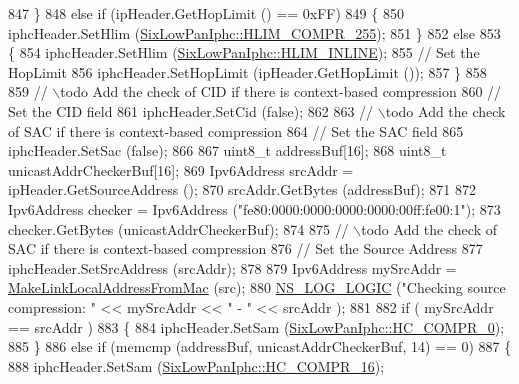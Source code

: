 \begin{DoxyCode}
847         \}
848       \textcolor{keywordflow}{else} \textcolor{keywordflow}{if} (ipHeader.GetHopLimit () == 0xFF)
849         \{
850           iphcHeader.SetHlim (\hyperlink{classns3_1_1SixLowPanIphc_a1fa5a18c5d53fd3583960b4ba01f093da7bc2759c764e52c397400f895fd6cb76}{SixLowPanIphc::HLIM\_COMPR\_255});
851         \}
852       \textcolor{keywordflow}{else}
853         \{
854           iphcHeader.SetHlim (\hyperlink{classns3_1_1SixLowPanIphc_a1fa5a18c5d53fd3583960b4ba01f093da5ac066771c5c58f74fbff81925000bd1}{SixLowPanIphc::HLIM\_INLINE});
855           \textcolor{comment}{// Set the HopLimit}
856           iphcHeader.SetHopLimit (ipHeader.GetHopLimit ());
857         \}
858 
859       \textcolor{comment}{// \(\backslash\)todo Add the check of CID if there is context-based compression}
860       \textcolor{comment}{// Set the CID field}
861       iphcHeader.SetCid (\textcolor{keyword}{false});
862 
863       \textcolor{comment}{// \(\backslash\)todo Add the check of SAC if there is context-based compression}
864       \textcolor{comment}{// Set the SAC field}
865       iphcHeader.SetSac (\textcolor{keyword}{false});
866 
867       uint8\_t addressBuf[16];
868       uint8\_t unicastAddrCheckerBuf[16];
869       Ipv6Address srcAddr = ipHeader.GetSourceAddress ();
870       srcAddr.GetBytes (addressBuf);
871 
872       Ipv6Address checker = Ipv6Address (\textcolor{stringliteral}{"fe80:0000:0000:0000:0000:00ff:fe00:1"});
873       checker.GetBytes (unicastAddrCheckerBuf);
874 
875       \textcolor{comment}{// \(\backslash\)todo Add the check of SAC if there is context-based compression}
876       \textcolor{comment}{// Set the Source Address}
877       iphcHeader.SetSrcAddress (srcAddr);
878 
879       Ipv6Address mySrcAddr = \hyperlink{classns3_1_1SixLowPanNetDevice_acf66b0ff019d0f1b88212d452044696e}{MakeLinkLocalAddressFromMac} (src);
880       \hyperlink{group__logging_ga88acd260151caf2db9c0fc84997f45ce}{NS\_LOG\_LOGIC} (\textcolor{stringliteral}{"Checking source compression: "} << mySrcAddr << \textcolor{stringliteral}{" - "} << srcAddr );
881 
882       \textcolor{keywordflow}{if} ( mySrcAddr == srcAddr )
883         \{
884           iphcHeader.SetSam (\hyperlink{classns3_1_1SixLowPanIphc_a384e6b68c86e9d9a07c923dbc21a6843a20c6daaf8cc1cfec17270484cec677c0}{SixLowPanIphc::HC\_COMPR\_0});
885         \}
886       \textcolor{keywordflow}{else} \textcolor{keywordflow}{if} (memcmp (addressBuf, unicastAddrCheckerBuf, 14) == 0)
887         \{
888           iphcHeader.SetSam (\hyperlink{classns3_1_1SixLowPanIphc_a384e6b68c86e9d9a07c923dbc21a6843a492caa9d3c810686e9e3f1c35ef39fd9}{SixLowPanIphc::HC\_COMPR\_16});

\end{DoxyCode}
